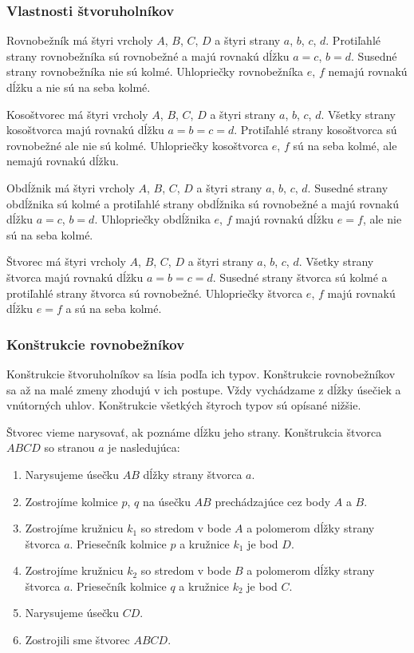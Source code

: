 \documentclass{article}
\begin{document}
\subsubsection{Vlastnosti štvoruholníkov}

Rovnobežník má štyri vrcholy \(A\), \(B\), \(C\), \(D\) a štyri strany \(a\), \(b\), \(c\), \(d\). Protiľahlé strany rovnobežníka sú rovnobežné a majú rovnakú dĺžku \(a = c\), \(b = d\). Susedné strany rovnobežníka nie sú kolmé. Uhlopriečky rovnobežníka \(e\), \(f\) nemajú rovnakú dĺžku a nie sú na seba kolmé.

Kosoštvorec má štyri vrcholy \(A\), \(B\), \(C\), \(D\) a štyri strany \(a\), \(b\), \(c\), \(d\). Všetky strany kosoštvorca majú rovnakú dĺžku \(a = b = c = d\). Protiľahlé strany kosoštvorca sú rovnobežné ale nie sú kolmé. Uhlopriečky kosoštvorca \(e\), \(f\) sú na seba kolmé, ale nemajú rovnakú dĺžku.

Obdĺžnik má štyri vrcholy \(A\), \(B\), \(C\), \(D\) a štyri strany \(a\), \(b\), \(c\), \(d\). Susedné strany obdĺžnika sú kolmé a protiľahlé strany obdĺžnika sú rovnobežné a majú rovnakú dĺžku \(a = c\), \(b = d\). Uhlopriečky obdĺžnika \(e\), \(f\) majú rovnakú dĺžku \(e = f\), ale nie sú na seba kolmé.

Štvorec má štyri vrcholy \(A\), \(B\), \(C\), \(D\) a štyri strany \(a\), \(b\), \(c\), \(d\). Všetky strany štvorca majú rovnakú dĺžku \(a = b = c = d\). Susedné strany štvorca sú kolmé a protiľahlé strany štvorca sú rovnobežné. Uhlopriečky štvorca \(e\), \(f\) majú rovnakú dĺžku \(e = f\) a sú na seba kolmé.

\subsubsection{Konštrukcie rovnobežníkov}

Konštrukcie štvoruholníkov sa lísia podľa ich typov. Konštrukcie rovnobežníkov sa až na malé zmeny zhodujú v ich postupe. Vždy vychádzame z dĺžky úsečiek a vnútorných uhlov. Konštrukcie všetkých štyroch typov sú opísané nižšie.

Štvorec vieme narysovať, ak poznáme dĺžku jeho strany. Konštrukcia štvorca \(ABCD\) so stranou \(a\) je nasledujúca:
\begin{enumerate}[label=\arabic*)]
  \item Narysujeme úsečku \(AB\) dĺžky strany štvorca \(a\).
  \item Zostrojíme kolmice \(p\), \(q\) na úsečku \(AB\) prechádzajúce cez body \(A\) a \(B\).
  \item Zostrojíme kružnicu \(k_1\) so stredom v bode \(A\) a polomerom dĺžky strany štvorca \(a\). Priesečník kolmice \(p\) a kružnice \(k_1\) je bod \(D\).
  \item Zostrojíme kružnicu \(k_2\) so stredom v bode \(B\) a polomerom dĺžky strany štvorca \(a\). Priesečník kolmice \(q\) a kružnice \(k_2\) je bod \(C\).
  \item Narysujeme úsečku \(CD\).
  \item Zostrojili sme štvorec \(ABCD\).
\end{enumerate}
\end{document}
